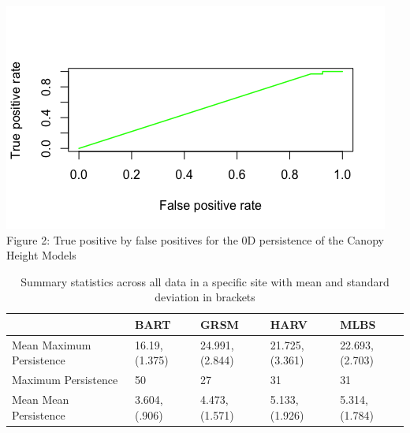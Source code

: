 \documentclass[10pt]{article}
\begin{document}
\includegraphics[scale= 0.5]{0d_roc}\\
Figure 2: True positive by false positives for the 0D persistence of the Canopy Height Models

\begin{table}[]
\centering
\caption{Summary statistics across all data in a specific site with mean and standard deviation in brackets}
\begin{tabular}{|l|l|l|l|l|}
\hline
                         & BART          & GRSM          & HARV          & MLBS          \\ \hline
Mean Maximum Persistence & 16.19,(1.375) & 24.991,(2.844) & 21.725,(3.361) & 22.693,(2.703)  \\ \hline
Maximum Persistence      &50            & 27            & 31            & 31            \\ \hline
Mean Mean Persistence    & 3.604,(.906) & 4.473,(1.571) & 5.133,(1.926) & 5.314,(1.784) \\ \hline
\end{tabular}
\end{table}
\end{document}

